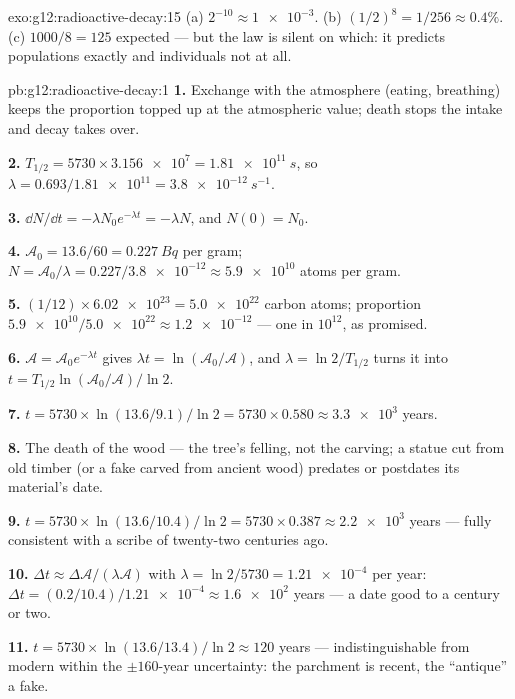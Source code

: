 \begin{solution}{exo:g12:radioactive-decay:15}
(a) $2^{-10} \approx \num{1e-3}$. (b) $(1/2)^8 = 1/256 \approx
0.4\%$. (c) $1000/8 = 125$ expected --- but the law is silent on
which: it predicts populations exactly and individuals not at all.
\end{solution}

\begin{solution}{pb:g12:radioactive-decay:1}
\textbf{1.} Exchange with the atmosphere (eating, breathing) keeps
the proportion topped up at the atmospheric value; death stops the
intake and decay takes over.

\textbf{2.} $T_{1/2} = \num{5730} \times \num{3.156e7} =
\qty{1.81e11}{s}$, so $\lambda = 0.693/\num{1.81e11} =
\qty{3.8e-12}{s^{-1}}$.

\textbf{3.} $\dd N/\dd t = -\lambda N_0 e^{-\lambda t} = -\lambda N$,
and $N(0) = N_0$.

\textbf{4.} $\mathcal A_0 = 13.6/60 = \qty{0.227}{Bq}$ per gram;
$N = \mathcal A_0/\lambda = 0.227/\num{3.8e-12} \approx \num{5.9e10}$
atoms per gram.

\textbf{5.} $(1/12) \times \num{6.02e23} = \num{5.0e22}$ carbon
atoms; proportion $\num{5.9e10}/\num{5.0e22} \approx \num{1.2e-12}$
--- one in $10^{12}$, as promised.

\textbf{6.} $\mathcal A = \mathcal A_0 e^{-\lambda t}$ gives
$\lambda t = \ln(\mathcal A_0/\mathcal A)$, and $\lambda =
\ln 2/T_{1/2}$ turns it into
$t = T_{1/2}\ln(\mathcal A_0/\mathcal A)/\ln 2$.

\textbf{7.} $t = \num{5730} \times \ln(13.6/9.1)/\ln 2 =
\num{5730} \times 0.580 \approx \num{3.3e3}$ years.

\textbf{8.} The death of the wood --- the tree's felling, not the
carving; a statue cut from old timber (or a fake carved from ancient
wood) predates or postdates its material's date.

\textbf{9.} $t = \num{5730} \times \ln(13.6/10.4)/\ln 2 =
\num{5730} \times 0.387 \approx \num{2.2e3}$ years --- fully
consistent with a scribe of twenty-two centuries ago.

\textbf{10.} $\Delta t \approx \Delta\mathcal A/(\lambda\mathcal A)$
with $\lambda = \ln 2/5730 = \num{1.21e-4}$ per year:
$\Delta t = (0.2/10.4)/\num{1.21e-4} \approx \num{1.6e2}$ years ---
a date good to a century or two.

\textbf{11.} $t = \num{5730} \times \ln(13.6/13.4)/\ln 2 \approx
120$ years --- indistinguishable from modern within the $\pm 160$-year
uncertainty: the parchment is recent, the ``antique'' a fake.


\end{solution}
